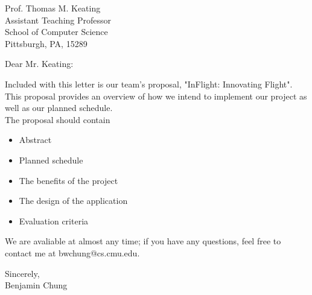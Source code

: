 \documentclass[10pt,a4paper]{letter}
\begin{document}
 
\begin{letter}{
Prof. Thomas M. Keating\\
Assistant Teaching Professor\\
School of Computer Science\\
Pittsburgh, PA, 15289} 
\opening{Dear Mr. Keating:} 

Included with this letter is our team's proposal, "InFlight: Innovating Flight". This proposal provides an overview of how we intend to implement our project as well as our planned schedule.\\

The proposal should contain
\begin{itemize}
\item Abstract
\item Planned schedule
\item The benefits of the project
\item The design of the application
\item Evaluation criteria\\
\end{itemize}

We are avaliable at almost any time; if you have any questions, feel free to contact me at bwchung@cs.cmu.edu.
\closing{Sincerely,\\ Benjamin Chung} 
\end{letter} 
\end{document}
